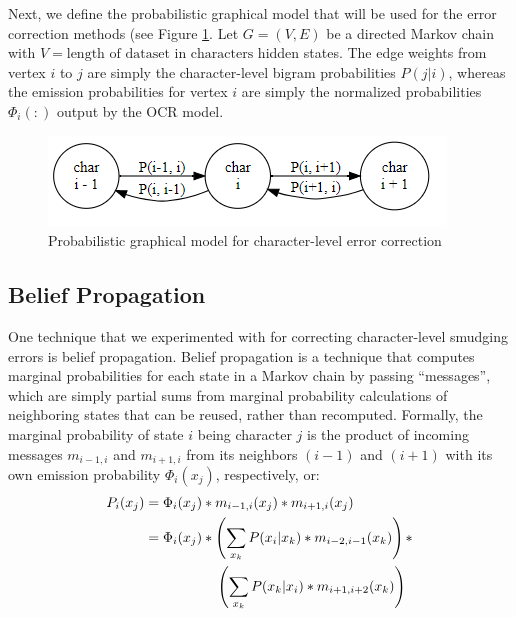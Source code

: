 \documentclass[10pt,twocolumn,letterpaper]{article}
\begin{document}
Next, we define the probabilistic graphical model that will be used
for the error correction methods (see Figure
\ref{fig:probabilistic_graphical_model}. Let $G = (V, E)$ be a directed
Markov chain with $V = \text{length of dataset in characters}$ hidden
states. The edge weights from vertex $i$ to $j$ are simply the
character-level bigram probabilities $P(j | i)$, whereas the emission
probabilities for vertex $i$ are simply the normalized probabilities 
$\Phi_i(:)$ output by the OCR model.

\begin{figure}
\includegraphics[scale=.8]{Capture.PNG}
\caption{\label{fig:probabilistic_graphical_model} Probabilistic graphical model for character-level error correction}
\end{figure}

\subsection{Belief Propagation}

One technique that we experimented with for correcting character-level
smudging errors is belief propagation. Belief propagation is a technique
that computes marginal probabilities for each state in a Markov chain
by passing ``messages'', which are simply partial sums from marginal
probability calculations of neighboring states that can be reused,
rather than recomputed. Formally, the marginal probability
of state $i$ being character $j$ is the product of incoming messages
$m_{i-1, i}$ and $m_{i + 1, i}$ from its neighbors $(i - 1)$ and
$(i + 1)$ with its own emission probability $\Phi_i(x_j)$, respectively, or:
\begin{equation}
\begin{split}
P_i(x_j) &= \Phi_i(x_j) * m_{i - 1, i}(x_j) * m_{i + 1, i}(x_j) \\
&= \Phi_i(x_j) * \left(\sum_{x_k} P(x_i | x_k) * m_{i - 2, i - 1}(x_k) \right) *\\
&\hspace{18mm} \left(\sum_{x_k} P(x_k | x_i) * m_{i + 1, i + 2}(x_k) \right) \\ 
\end{split}
\end{equation}
\end{document}
